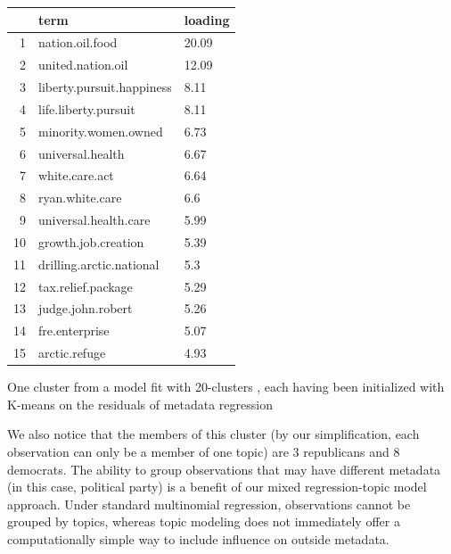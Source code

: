 \documentclass[12pt]{article}
\begin{document}




\begin{table}[ht]
\centering
\begin{threeparttable}
\begin{tabular}{rll}
  \hline
 & term & loading \\ 
  \hline
1 & nation.oil.food & 20.09 \\ 
  2 & united.nation.oil & 12.09 \\ 
  3 & liberty.pursuit.happiness & 8.11 \\ 
  4 & life.liberty.pursuit & 8.11 \\ 
  5 & minority.women.owned & 6.73 \\ 
  6 & universal.health & 6.67 \\ 
  7 & white.care.act & 6.64 \\ 
  8 & ryan.white.care & 6.6 \\ 
  9 & universal.health.care & 5.99 \\ 
  10 & growth.job.creation & 5.39 \\ 
  11 & drilling.arctic.national & 5.3 \\ 
  12 & tax.relief.package & 5.29 \\ 
  13 & judge.john.robert & 5.26 \\ 
  14 & fre.enterprise & 5.07 \\ 
  15 & arctic.refuge & 4.93 \\ 
   \hline
\end{tabular}
\begin{tablenotes}
\small
\item One cluster from a model fit with 20-clusters , each having been initialized with K-means on the residuals of metadata regression
\end{tablenotes}
\end{threeparttable}
\end{table}


We also notice that the members of this cluster (by our simplification, each observation can only be a member of one topic) are 3 republicans and 8 democrats. 
The ability to group observations that may have different metadata (in this case, political party) is a benefit of our mixed regression-topic model approach. 
Under standard multinomial regression, observations cannot be grouped by topics, whereas topic modeling does not immediately offer a computationally simple way to include influence on outside metadata.
\end{document}

